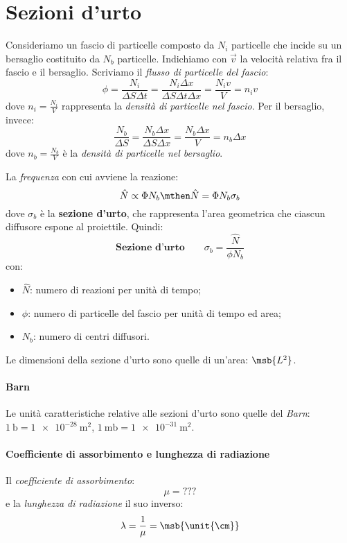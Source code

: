 \section{Sezioni d'urto}
Consideriamo un fascio di particelle composto da $N_i$ particelle che incide su
un bersaglio costituito da $N_b$ particelle.
Indichiamo con $\vec{v}$ la velocità relativa fra il fascio e il bersaglio.
Scriviamo il \textit{flusso di particelle del fascio}:
\begin{equation}
	\phi
	= \frac{N_i}{\Delta S \Delta t}
	= \frac{N_i \Delta x}{\Delta S \Delta t \Delta x}
	= \frac{N_i v}{V}
	= n_i v
\end{equation}
dove $n_i = \frac{N_i}{V}$ rappresenta la \textit{densità di particelle nel
	fascio}.
Per il bersaglio, invece:
\begin{equation}
	\frac{N_b}{\Delta S}
	= \frac{N_b \Delta x}{\Delta S \Delta x}
	= \frac{N_b \Delta x}{V}
	= n_b \Delta x
\end{equation}
dove $n_b = \frac{N_b}{V}$ è la \textit{densità di particelle nel bersaglio}.

La \textit{frequenza} con cui avviene la reazione:
\begin{equation}
	\hat{N} \propto \Phi N_b
	\mthen
	\hat{N} = \Phi N_b \sigma_b
\end{equation}
dove $\sigma_b$ è la \textbf{sezione d'urto}, che rappresenta l'area geometrica
che ciascun diffusore espone al proiettile.
Quindi:
\begin{equation}
	\textbf{Sezione d'urto}
	\qquad
	\boxed{
		\sigma_b = \frac{\hat{N}}{\phi N_b}
	}
\end{equation}
con:
\begin{itemize}
	\item $\hat{N}$: numero di reazioni per unità di tempo;
	\item $\phi$: numero di particelle del fascio per unità di tempo ed area;
	\item $N_b$: numero di centri diffusori.
\end{itemize}
Le dimensioni della sezione d'urto sono quelle di un'area: $\msb{L^2}$.

\paragraph{Barn}
Le unità caratteristiche relative alle sezioni d'urto sono quelle del
\textit{Barn}: $\qty{1}{\barn} = \qty{1e-28}{\metre^2}$,
$\qty{1}{\milli\barn} = \qty{1e-31}{\metre^2}$.

\paragraph{Coefficiente di assorbimento e lunghezza di radiazione}
Il \textit{coefficiente di assorbimento}:
\begin{equation}
	\mu = ???
\end{equation}
e la \textit{lunghezza di radiazione} il suo inverso:
\begin{equation}
	\lambda = \frac{1}{\mu} = \msb{\unit{\cm}}
\end{equation}

